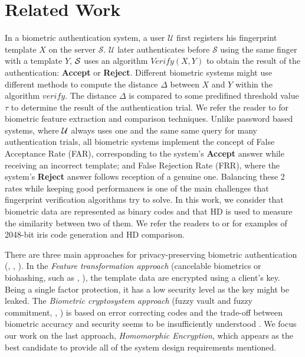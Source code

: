 \section{Related Work}
\label{sec:iscRelatedWor}
In a biometric authentication system, a user $\mathcal{U}$ first registers his fingerprint template $X$ on the server
$\mathcal{S}$. $\mathcal{U}$ later authenticates before $\mathcal{S}$ using the same finger with a template $Y$, $\mathcal{S}$
uses an algorithm $Verify(X,Y)$ to obtain the result of the authentication: \textbf{Accept} or
\textbf{Reject}. Different biometric systems might use different methods to compute the distance $\Delta$ between $X$ and
$Y$ within the algorithm $verify$. The distance $\Delta$ is compared to some predifined threshold value $\tau$ to determine
the result of the authentication trial. We refer the reader to \cite{jain2007handbook} for biometric feature extraction and
comparison techniques. Unlike password based systems, where $\mathcal{U}$ always uses one and the same same query for many authentication trials,
all biometric systems implement the concept of False Acceptance Rate (FAR), corresponding to the system's \textbf{Accept} answer while receiving an incorrect
template; and False Rejection Rate (FRR), where the system's \textbf{Reject} answer follows reception of a genuine one.  Balancing these 2 rates
while keeping good performances is one of the main challenges that fingerprint verification algorithms
\cite{FVConGoi2:online} try to solve. In this work, we consider that biometric data are represented as binary
codes and that HD is used to measure the similarity between two of them. We refer the readers to \cite{daugman2003importance}
or \cite{FujitsuD7:online} for examples of 2048-bit iris code generation and HD comparison.

There are three main approaches for privacy-preserving biometric authentication (\cite{jain201650},
\cite{belguechi2011overview}, \cite{jain2008biometric}). In the \emph{Feature transformation approach} (cancelable
biometrics or biohashing, such as \cite{teoh2008cancellable}, \cite{cappelli2010minutia}), the template data are
encrypted using a client's key. Being a single factor protection, it has a low security level as the key might be leaked. The \emph{Biometric
  cryptosystem approach} (fuzzy vault and fuzzy commitment, \cite{uludag2004biometric}, \cite{nagar2010hybrid}) is based
on error correcting codes and the trade-off between biometric accuracy and security seems to be insufficiently understood . We focus
our work on the last approach, \emph{Homomorphic Encryption}, which appears as the best candidate to provide all of the system design requirements mentioned.


